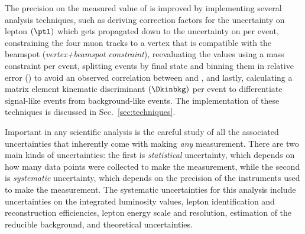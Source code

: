 The precision on the measured value of \mH is improved by implementing several analysis techniques, such as
deriving correction factors for the uncertainty on lepton \pt $\left( \ptl \right)$ which gets propagated down to the uncertainty on \mfourl per event,
constraining the four muon tracks to a vertex that is compatible with the beamspot (\emph{vertex+beamspot constraint}),
reevaluating the \ptl values using a \Zone mass constraint per event,
splitting events by final state and binning them in relative \mfourl error (\relmfourlerrflat) to avoid an observed correlation between \relmfourlerrflat and \Dkinbkg,
and lastly, calculating a matrix element kinematic discriminant $\left( \Dkinbkg \right)$ per event to differentiate signal-like events from background-like events.
The implementation of these techniques is discussed in Sec.~\ref{sec:techniques}.



Important in any scientific analysis is the careful study of all the associated uncertainties that inherently come with making \emph{any} measurement.
There are two main kinds of uncertainties:
the first is \emph{statistical} uncertainty, which depends on how many data points were collected to make the measurement,
while the second is \emph{systematic} uncertainty, which depends on the precision of the instruments used to make the measurement.
The systematic uncertainties for this analysis include uncertainties on the integrated luminosity values, lepton identification and reconstruction efficiencies, lepton energy scale and resolution, estimation of the reducible background, and theoretical uncertainties.

